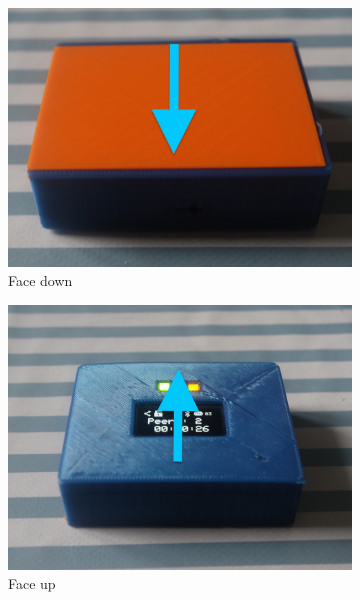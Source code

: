 \documentclass[mscthesis]{usiinfthesis}
\begin{document}
\begin{figure} [!ht]
\begin{subfigure}{0.19\textwidth}
\includegraphics[width=\linewidth]{Facedown}
\caption{Face down} \label{fig:1a}
\end{subfigure}
\hspace*{\fill} %
\begin{subfigure}{0.19\textwidth}
\includegraphics[width=\linewidth]{Faceup}
\caption{Face up} \label{fig:1b}
\end{subfigure}
\hspace*{\fill} %
\begin{subfigure}{0.20\textwidth}

\end{subfigure}
\end{figure}
\end{document}
